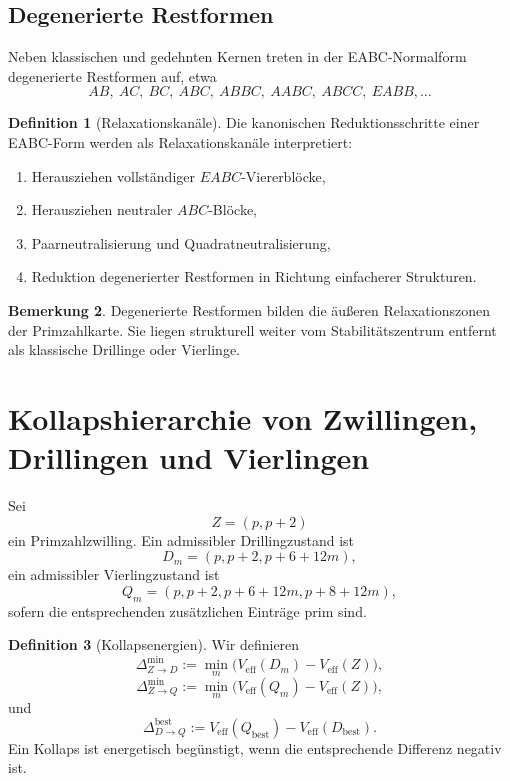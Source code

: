 \documentclass[11pt,a4paper]{article}
\theoremstyle{definition}
\newtheorem{definition}{Definition}[section]
\newtheorem{remark}[definition]{Bemerkung}
\theoremstyle{plain}
\begin{document}
	\subsection{Degenerierte Restformen}
	
	Neben klassischen und gedehnten Kernen treten in der EABC-Normalform degenerierte Restformen auf, etwa
	\[
	AB,\ AC,\ BC,\ ABC,\ ABBC,\ AABC,\ ABCC,\ EABB,\dots
	\]
	
	\begin{definition}[Relaxationskanäle]
		Die kanonischen Reduktionsschritte einer EABC-Form werden als Relaxationskanäle interpretiert:
		\begin{enumerate}[label=(\arabic*)]
			\item Herausziehen vollständiger $EABC$-Viererblöcke,
			\item Herausziehen neutraler $ABC$-Blöcke,
			\item Paarneutralisierung und Quadratneutralisierung,
			\item Reduktion degenerierter Restformen in Richtung einfacherer Strukturen.
		\end{enumerate}
	\end{definition}
	
	\begin{remark}
		Degenerierte Restformen bilden die äußeren Relaxationszonen der Primzahlkarte. Sie liegen strukturell weiter vom Stabilitätszentrum entfernt als klassische Drillinge oder Vierlinge.
	\end{remark}
	
	\section{Kollapshierarchie von Zwillingen, Drillingen und Vierlingen}
	
	Sei
	\[
	Z=(p,p+2)
	\]
	ein Primzahlzwilling. Ein admissibler Drillingzustand ist
	\[
	D_m=(p,p+2,p+6+12m),
	\]
	ein admissibler Vierlingzustand ist
	\[
	Q_m=(p,p+2,p+6+12m,p+8+12m),
	\]
	sofern die entsprechenden zusätzlichen Einträge prim sind.
	
	\begin{definition}[Kollapsenergien]
		Wir definieren
		\[
		\Delta_{Z\to D}^{\min}:=\min_m\bigl(V_{\mathrm{eff}}(D_m)-V_{\mathrm{eff}}(Z)\bigr),
		\]
		\[
		\Delta_{Z\to Q}^{\min}:=\min_m\bigl(V_{\mathrm{eff}}(Q_m)-V_{\mathrm{eff}}(Z)\bigr),
		\]
		und
		\[
		\Delta_{D\to Q}^{\mathrm{best}}:=V_{\mathrm{eff}}(Q_{\mathrm{best}})-V_{\mathrm{eff}}(D_{\mathrm{best}}).
		\]
		Ein Kollaps ist energetisch begünstigt, wenn die entsprechende Differenz negativ ist.
	\end{definition}
	
\end{document}
